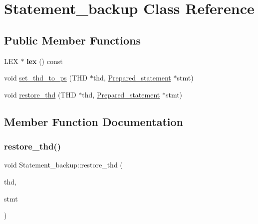 \hypertarget{classStatement__backup}{}\section{Statement\+\_\+backup Class Reference}
\label{classStatement__backup}
\subsection*{Public Member Functions}
\begin{DoxyCompactItemize}
\item 
\mbox{\label{classStatement__backup_add4905aef47081b6b66c14187f8c7b8f}} 
L\+EX $\ast$ {\bfseries lex} () const
\item 
void \mbox{\hyperlink{classStatement__backup_ab441c001d75a8692d54fcbd80255c462}{set\+\_\+thd\+\_\+to\+\_\+ps}} (T\+HD $\ast$thd, \mbox{\hyperlink{classPrepared__statement}{Prepared\+\_\+statement}} $\ast$stmt)
\item 
void \mbox{\hyperlink{classStatement__backup_a9ac84f373086cd9c5ce4636e1ab60235}{restore\+\_\+thd}} (T\+HD $\ast$thd, \mbox{\hyperlink{classPrepared__statement}{Prepared\+\_\+statement}} $\ast$stmt)
\end{DoxyCompactItemize}


\subsection{Member Function Documentation}
\mbox{\label{classStatement__backup_a9ac84f373086cd9c5ce4636e1ab60235}} 
\subsubsection{\texorpdfstring{restore\+\_\+thd()}{restore\_thd()}}
{\footnotesize\ttfamily void Statement\+\_\+backup\+::restore\+\_\+thd (\begin{DoxyParamCaption}\item[{T\+HD $\ast$}]{thd,  }\item[{\mbox{\hyperlink{classPrepared__statement}{Prepared\+\_\+statement}} $\ast$}]{stmt }\end{DoxyParamCaption})\hspace{0.3cm}{\ttfamily [inline]}}

